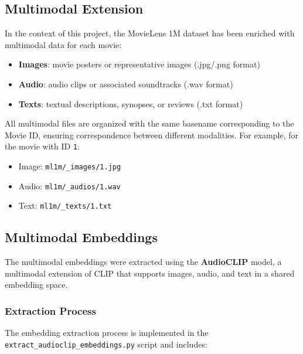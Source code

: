 \subsection{Multimodal Extension}

In the context of this project, the MovieLens 1M dataset has been enriched with multimodal data for each movie:

\begin{itemize}
    \item \textbf{Images}: movie posters or representative images (.jpg/.png format)
    \item \textbf{Audio}: audio clips or associated soundtracks (.wav format)
    \item \textbf{Texts}: textual descriptions, synopses, or reviews (.txt format)
\end{itemize}

All multimodal files are organized with the same basename corresponding to the Movie ID, ensuring correspondence between different modalities. For example, for the movie with ID \texttt{1}:
\begin{itemize}
    \item Image: \texttt{ml1m/\_images/1.jpg}
    \item Audio: \texttt{ml1m/\_audios/1.wav}
    \item Text: \texttt{ml1m/\_texts/1.txt}
\end{itemize}

\subsection{Multimodal Embeddings}

The multimodal embeddings were extracted using the \textbf{AudioCLIP} model, a multimodal extension of CLIP that supports images, audio, and text in a shared embedding space.

\subsubsection{Extraction Process}

The embedding extraction process is implemented in the \texttt{extract\_audioclip\_embeddings.py} script and includes:

